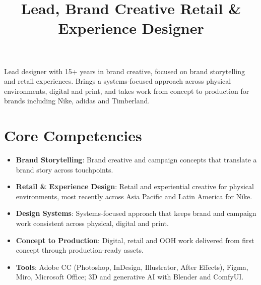 \documentclass[11pt,letterpaper,sans]{moderncv}
\title{Lead, Brand Creative Retail \& Experience Designer}
\begin{document}
\makecvtitle


\vspace{6pt}
\small{Lead designer with 15+ years in brand creative, focused on brand storytelling and retail experiences. Brings a systems-focused approach across physical environments, digital and print, and takes work from concept to production for brands including Nike, adidas and Timberland.}


\section{Core Competencies}
\vspace{1pt}
\begin{itemize}

\item \textbf{Brand Storytelling}: Brand creative and campaign concepts that translate a brand story across touchpoints.

\item \textbf{Retail \& Experience Design}: Retail and experiential creative for physical environments, most recently across Asia Pacific and Latin America for Nike.

\item \textbf{Design Systems}: Systems-focused approach that keeps brand and campaign work consistent across physical, digital and print.

\item \textbf{Concept to Production}: Digital, retail and OOH work delivered from first concept through production-ready assets.

\item \textbf{Tools}: Adobe CC (Photoshop, InDesign, Illustrator, After Effects), Figma, Miro, Microsoft Office; 3D and generative AI with Blender and ComfyUI.

\end{itemize}

\end{document}

